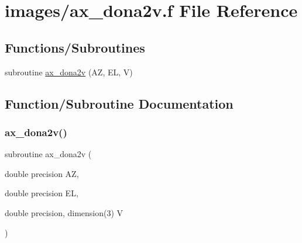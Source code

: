 \hypertarget{ax__dona2v_8f}{}\section{images/ax\+\_\+dona2v.f File Reference}
\label{ax__dona2v_8f}
\subsection*{Functions/\+Subroutines}
\begin{DoxyCompactItemize}
\item 
subroutine \hyperlink{ax__dona2v_8f_a9cbdb7ea0943eeeb6a3dddce784704bb}{ax\+\_\+dona2v} (AZ, EL, V)
\end{DoxyCompactItemize}


\subsection{Function/\+Subroutine Documentation}
\mbox{\label{ax__dona2v_8f_a9cbdb7ea0943eeeb6a3dddce784704bb}} 
\subsubsection{\texorpdfstring{ax\+\_\+dona2v()}{ax\_dona2v()}}
{\footnotesize\ttfamily subroutine ax\+\_\+dona2v (\begin{DoxyParamCaption}\item[{double precision}]{AZ,  }\item[{double precision}]{EL,  }\item[{double precision, dimension(3)}]{V }\end{DoxyParamCaption})}

